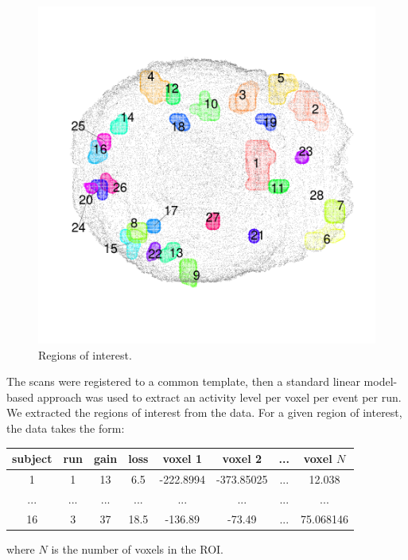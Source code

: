 \documentclass[12pt]{article}
\begin{document}
\begin{figure}[h]
\includegraphics[scale = 0.1]{../a7plots/all_rois_view3.png}
\caption{Regions of interest.}
\end{figure}

The scans were registered to a common template, then a standard linear model-based approach
was used to extract an activity level per voxel per event per run.
We extracted the regions of interest from the data.  For a given region of interest, the data takes the form:

\begin{tabular}{|c|c|c|c||c|c|c|c|}
\hline
subject & run & gain & loss & voxel 1 & voxel 2 & ... & voxel $N$ \\
\hline
 1 & 1 & 13 &  6.5 & -222.8994 &  -373.85025 & ... & 12.038\\
... & ... & ... & ... & ... & ... & ... & ...\\
16 & 3 & 37 & 18.5 & -136.89 & -73.49 & ... & 75.068146 \\
\hline
\end{tabular}

where $N$ is the number of voxels in the ROI.
\end{document}
